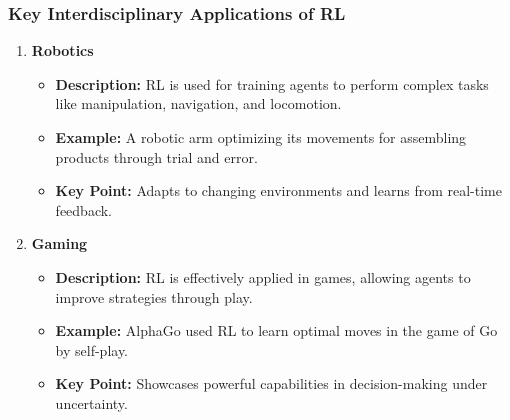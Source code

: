 \documentclass{beamer}
\begin{document}
\begin{frame}[fragile]
    \frametitle{Key Interdisciplinary Applications of RL}
    \begin{enumerate}
        \item \textbf{Robotics}
            \begin{itemize}
                \item \textbf{Description:} RL is used for training agents to perform complex tasks like manipulation, navigation, and locomotion.
                \item \textbf{Example:} A robotic arm optimizing its movements for assembling products through trial and error.
                \item \textbf{Key Point:} Adapts to changing environments and learns from real-time feedback.
            \end{itemize}
        
        \item \textbf{Gaming}
            \begin{itemize}
                \item \textbf{Description:} RL is effectively applied in games, allowing agents to improve strategies through play.
                \item \textbf{Example:} AlphaGo used RL to learn optimal moves in the game of Go by self-play.
                \item \textbf{Key Point:} Showcases powerful capabilities in decision-making under uncertainty.
            \end{itemize}
    \end{enumerate}
\end{frame}
\end{document}
